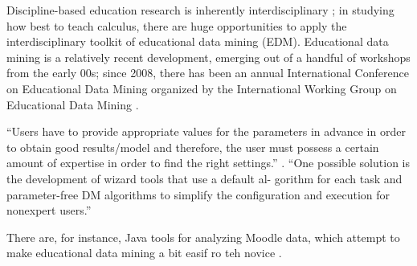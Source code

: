\documentclass[12pt]{article}
\begin{document}
Discipline-based education research is inherently interdisciplinary
\cite{dber-report}; in studying how best to teach calculus, there are
huge opportunities to apply the interdisciplinary toolkit of
educational data mining (EDM).  Educational data mining is a
relatively recent development, emerging out of a handful of workshops
from the early 00s; since 2008, there has been an annual International
Conference on Educational Data Mining organized by the International
Working Group on Educational Data Mining \parencite{WIDM:WIDM1075}.



``Users have to provide appropriate values for the parameters in
advance in order to obtain good results/model and therefore, the user
must possess a certain amount of expertise in order to find the right
settings.'' \parencite{romero2010educational}.     ``One possible solution
is the development of wizard tools that use a default al- gorithm for
each task and parameter-free DM algorithms to simplify the
configuration and execution for nonexpert users.''

There are, for instance, Java tools for analyzing Moodle data, which
attempt to make educational data mining a bit easif ro teh
novice \parencite{java-data-mining}.
\end{document}
